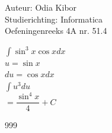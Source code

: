 \documentclass[a4paper]{article}
\begin{document}
  
\noindent \large Auteur: Odia Kibor \\
\noindent \large Studierichting: Informatica\\
\noindent \large Oefeningenreeks 4A nr. 51.4\\

\medskip

\normalsize


$ \displaystyle\int \sin^3x \cos x dx $\\

$u = \sin x$\\

$du = \cos x dx$\\

$ \displaystyle\int u^3 du $\\

$ = \dfrac{\sin^4 x}{4} + C $\\


















\begin{thebibliography}{999}
\end{thebibliography}
\end{document}
